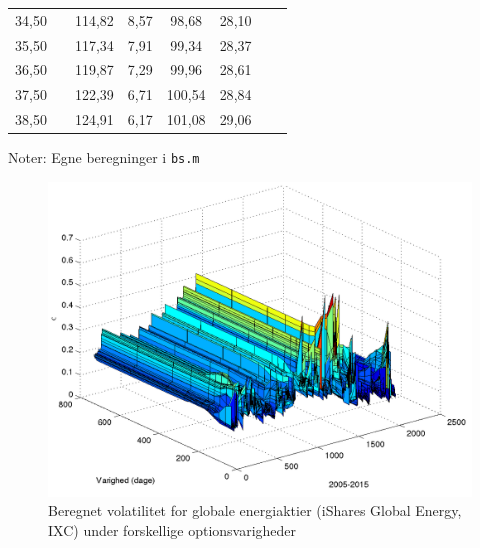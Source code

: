 \documentclass{article}
\begin{document}
\begin{table}[h]
\begin{center}
\begin{tabular}{cXcccccr}
         34{,}50   &&     114{,}82     &     8{,}57&         98{,}68     &    28{,}10 \\
         35{,}50    &&    117{,}34     &     7{,}91&         99{,}34   &      28{,}37 \\
         36{,}50    &&    119{,}87     &     7{,}29&         99{,}96    &     28{,}61 \\
         37{,}50    &&    122{,}39      &    6{,}71&        100{,}54  &       28{,}84 \\
         38{,}50    &&    124{,}91     &     6{,}17&        101{,}08&         29{,}06 \\
	\bottomrule[1pt]
	\end{tabular}
\end{center}
	\begin{minipage}{\linewidth}
		\footnotesize{Noter: Egne beregninger i \texttt{bs.m} }
	\end{minipage}
\end{table}	

\begin{figure}
\centerline{\includegraphics[scale=0.8]{../matlab/figs/implied_vol_curve_guan}}
\caption{Beregnet volatilitet for globale energiaktier (iShares Global Energy, IXC) under forskellige optionsvarigheder}
\label{fig:option_vol_curve}
\end{figure}
\end{document}
